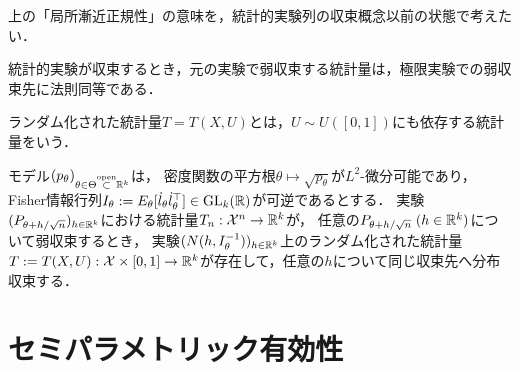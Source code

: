 \documentclass[uplatex,dvipdfmx]{jsreport}
\begin{document}
\begin{tcolorbox}[colframe=ForestGreen, colback=ForestGreen!10!white,breakable,colbacktitle=ForestGreen!40!white,coltitle=black,fonttitle=\bfseries\sffamily,
title=]
    上の「局所漸近正規性」の意味を，統計的実験列の収束概念以前の状態で考えたい．

\end{tcolorbox}

\begin{discussion}
    統計的実験が収束するとき，元の実験で弱収束する統計量は，極限実験での弱収束先に法則同等である．
\end{discussion}

\begin{definition}
    ランダム化された統計量$T=T(X,U)$とは，$U\sim U([0,1])$にも依存する統計量をいう．
\end{definition}

\begin{theorem}[局所漸近正規性の十分条件]
    モデル$(p_\theta)_{\theta\in\Theta\overset{\mathrm{open}}{\subset}\mathbb{R}^k}$は，
    密度関数の平方根$\theta\mapsto\sqrt{p_\theta}$が$L^2$-微分可能であり，Fisher情報行列$I_\theta:=E_\theta[\dot{l}_\theta\dot{l}_\theta^\top]\in\mathrm{GL}_k(\mathbb{R})$が可逆であるとする．
    実験$(P_{\theta+h/\sqrt{n}})_{h\in\mathbb{R}^k}$における統計量$T_n:\mathcal{X}^n\to\mathbb{R}^k$が，
    任意の$P_{\theta+h/\sqrt{n}}\;(h\in\mathbb{R}^k)$について弱収束するとき，
    実験$(N(h,I^{-1}_{\theta}))_{h\in\mathbb{R}^k}$上のランダム化された統計量$T:=T(X,U):\mathcal{X}\times[0,1]\to\mathbb{R}^k$が存在して，任意の$h$について同じ収束先へ分布収束する．
\end{theorem}

\chapter{セミパラメトリック有効性}
\end{document}
